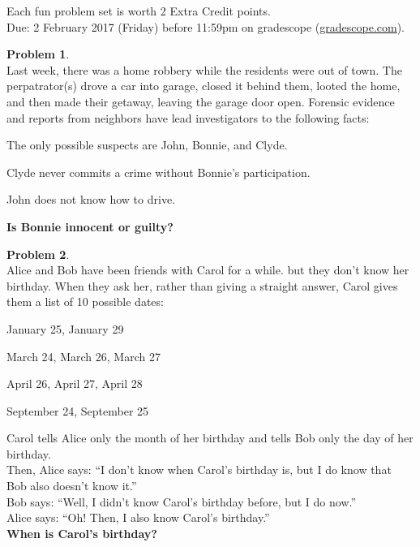 \documentclass{article}
\theoremstyle{definition}
\newtheorem{problem}{Problem}
\newtheorem*{solution}{Solution}
\begin{document}
\noindent
Each fun problem set is worth 2 Extra Credit points.\\
Due: 2 February 2017 (Friday) before 11:59pm on gradescope (\url{gradescope.com}).\\

\noindent
\begin{problem}\ \\
Last week, there was a home robbery while the residents were out of town.  The perpatrator(s) drove a car into garage, closed it behind them, looted the home, and then made their getaway, leaving the garage door open.  Forensic evidence and reports from neighbors have lead investigators to the following facts:
\begin{compactenum}
\item The only possible suspects are John, Bonnie, and Clyde.
\item Clyde never commits a crime without Bonnie's participation.
\item John does not know how to drive.
\end{compactenum}
\textbf{Is Bonnie innocent or guilty?}
\end{problem}


\begin{problem}\ \\
Alice and Bob have been friends with Carol for a while. but they don't know her birthday.  When they ask her, rather than giving a straight answer, Carol gives them a list of 10 possible dates:
\begin{compactenum}
\item January 25, January 29
\item March 24, March 26, March 27
\item April 26, April 27, April 28
\item September 24, September 25
\end{compactenum}
Carol tells Alice only the month of her birthday and tells Bob only the day of her birthday.\\
Then, Alice says: ``I don't  know when Carol's birthday is, but I do know that Bob also doesn't know it.''\\
Bob says: ``Well, I didn't know Carol's birthday before, but I do now.''\\
Alice says: ``Oh! Then, I also know Carol's birthday.''\\
\textbf{When is Carol's birthday?}
\end{problem}
\end{document}
